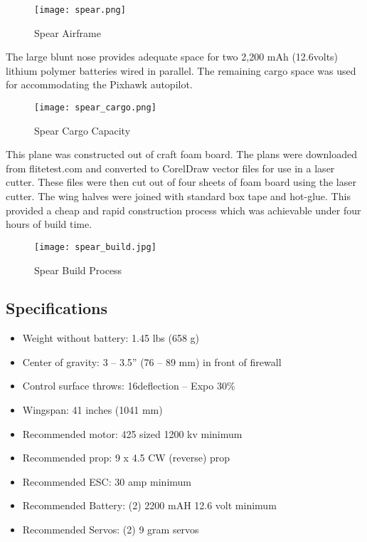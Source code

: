 \begin{figure}[!h]
 \centering
  \texttt{[image: spear.png]}
  \caption{Spear Airframe}
  \label{fig:spear}
\end{figure}

The large blunt nose provides adequate space for two 2,200 mAh (12.6volts) lithium polymer batteries wired in parallel.  The remaining cargo space was used for accommodating the Pixhawk autopilot.

\begin{figure}[!h]
 \centering
  \texttt{[image: spear\_cargo.png]}
  \caption{Spear Cargo Capacity}
  \label{fig:spear_cargo}
\end{figure}

This plane was constructed out of craft foam board.  The plans were downloaded from flitetest.com\cite{flitetest} and converted to CorelDraw vector files for use in a laser cutter.  These files were then cut out of four sheets of foam board using the laser cutter.  The wing halves were joined with standard box tape and hot-glue.  This provided a cheap and rapid construction process which was achievable under four hours of build time.

\begin{figure}[!h]
 \centering
  \texttt{[image: spear\_build.jpg]}
  \caption{Spear Build Process}
  \label{fig:spear_build}
\end{figure}

\subsection{Specifications}
\begin{itemize}
	\item Weight without battery: 1.45 lbs (658 g)
	\item Center of gravity: 3 – 3.5” (76 – 89 mm) in front of firewall
	\item Control surface throws: 16\degrees  deflection – Expo 30\%
	\item Wingspan: 41 inches (1041 mm)
	\item Recommended motor: 425 sized 1200 kv minimum
	\item Recommended prop: 9 x 4.5 CW (reverse) prop
	\item Recommended ESC: 30 amp minimum
	\item Recommended Battery: (2) 2200 mAH 12.6 volt minimum
	\item Recommended Servos: (2) 9 gram servos 
\end{itemize}



